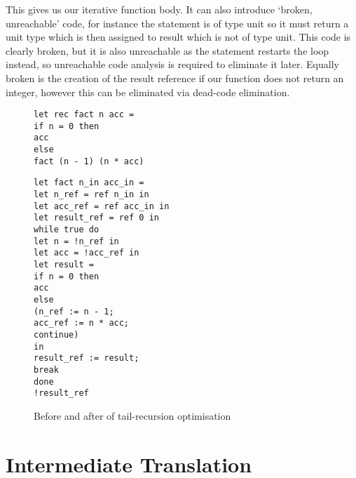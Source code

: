 This gives us our iterative function body. It can also introduce `broken, unreachable' code, for instance the  statement is of type unit so it must return a unit type which is then assigned to result which is not of type unit. This code is clearly broken, but it is also unreachable as the  statement restarts the loop instead, so unreachable code analysis is required to eliminate it later. Equally broken is the creation of the result reference if our function does not return an integer, however this can be eliminated via dead-code elimination.

\begin{figure}[h]
\begin{minipage}{0.5\linewidth}
\begin{verbatim}
let rec fact n acc =
if n = 0 then
acc
else
fact (n - 1) (n * acc)
\end{verbatim}
\end{minipage}
\begin{minipage}{0.5\linewidth}
\begin{verbatim}
let fact n_in acc_in =
let n_ref = ref n_in in
let acc_ref = ref acc_in in
let result_ref = ref 0 in
while true do
let n = !n_ref in
let acc = !acc_ref in
let result =
if n = 0 then
acc
else
(n_ref := n - 1;
acc_ref := n * acc;
continue)
in
result_ref := result;
break
done
!result_ref
\end{verbatim}
\end{minipage}
\caption{Before and after of tail-recursion optimisation}
\label{fig:tailrec}
\end{figure}





\section{Intermediate Translation}

